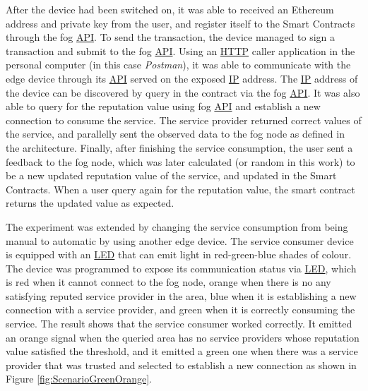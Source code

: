 \npara After the device had been switched on, it was able to received an Ethereum address and private key from the user, and register itself to the Smart Contracts through the fog \hyperref[Acronym-API]{API}.
To send the transaction, the device managed to sign a transaction and submit to the fog \hyperref[Acronym-API]{API}.
Using an \hyperref[Acronym-HTTP]{HTTP} caller application in the personal computer (in this case \textit{Postman}), it was able to communicate with the edge device through its \hyperref[Acronym-API]{API} served on the exposed \hyperref[Acronym-IP]{IP} address.
The \hyperref[Acronym-IP]{IP} address of the device can be discovered by query in the contract via the fog \hyperref[Acronym-API]{API}.
It was also able to query for the reputation value using fog \hyperref[Acronym-API]{API} and establish a new connection to consume the service.
The service provider returned correct values of the service, and parallelly sent the observed data to the fog node as defined in the architecture.
Finally, after finishing the service consumption, the user sent a feedback to the fog node, which was later calculated (or random in this work) to be a new updated reputation value of the service, and updated in the Smart Contracts.
When a user query again for the reputation value, the smart contract returns the updated value as expected.

\npara The experiment was extended by changing the service consumption from being manual to automatic by using another edge device.
The service consumer device is equipped with an \hyperref[Acronym-LED]{LED} that can emit light in red-green-blue shades of colour.
The device was programmed to expose its communication status via \hyperref[Acronym-LED]{LED}, which is
  red when it cannot connect to the fog node,
  orange when there is no any satisfying reputed service provider in the area,
  blue when it is establishing a new connection with a service provider,
  and green when it is correctly consuming the service.
The result shows that the service consumer worked correctly.
It emitted an orange signal when the queried area has no service providers whose reputation value satisfied the threshold, and it emitted a green one when there was a service provider that was trusted and selected to establish a new connection as shown in Figure \ref{fig:ScenarioGreenOrange}.
